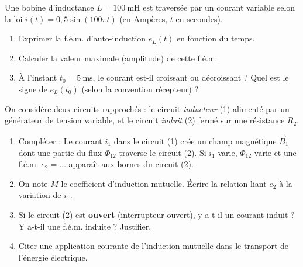\documentclass[11pt]{article}
\begin{document}
\begin{exercice}
Une bobine d'inductance $L = \SI{100}{\milli\henry}$ est traversée par un courant variable selon la loi $i(t) = 0,5 \sin(100\pi t)$ (en Ampères, $t$ en secondes).
\begin{enumerate}
    \item Exprimer la f.é.m. d'auto-induction $e_L(t)$ en fonction du temps.
    \item Calculer la valeur maximale (amplitude) de cette f.é.m.
    \item À l'instant $t_0 = \SI{5}{\milli\second}$, le courant est-il croissant ou décroissant ? Quel est le signe de $e_L(t_0)$ (selon la convention récepteur) ?
\end{enumerate}
\end{exercice}

\begin{exercice}
On considère deux circuits rapprochés : le circuit \textit{inducteur} (1) alimenté par un générateur de tension variable, et le circuit \textit{induit} (2) fermé sur une résistance $R_2$.
\begin{enumerate}
    \item Compléter : Le courant $i_1$ dans le circuit (1) crée un champ magnétique $\vec{B}_1$ dont une partie du flux $\Phi_{12}$ traverse le circuit (2). Si $i_1$ varie, $\Phi_{12}$ varie et une f.é.m. $e_2 = \dots$ apparaît aux bornes du circuit (2).
    \item On note $M$ le coefficient d'induction mutuelle. Écrire la relation liant $e_2$ à la variation de $i_1$.
    \item Si le circuit (2) est \textbf{ouvert} (interrupteur ouvert), y a-t-il un courant induit ? Y a-t-il une f.é.m. induite ? Justifier.
    \item Citer une application courante de l'induction mutuelle dans le transport de l'énergie électrique.
\end{enumerate}
\end{exercice}
\end{document}
